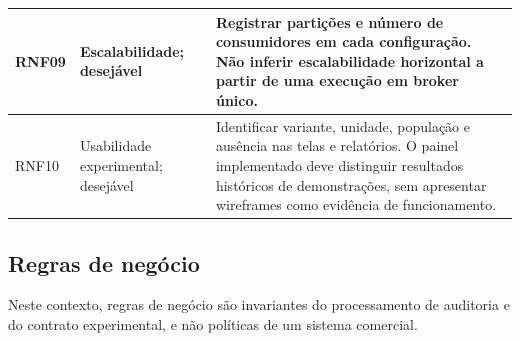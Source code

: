 {\begin{longtable}{>{\raggedright\arraybackslash}p{}>{\raggedright\arraybackslash}p{}>{\raggedright\arraybackslash}p{}}
RNF09 & Escalabilidade; desejável & Registrar partições e número de consumidores em cada configuração. Não inferir escalabilidade horizontal a partir de uma execução em broker único.\\ \hline
RNF10 & Usabilidade experimental; desejável & Identificar variante, unidade, população e ausência nas telas e relatórios. O painel implementado deve distinguir resultados históricos de demonstrações, sem apresentar wireframes como evidência de funcionamento.\\ \hline
\end{longtable}
\par
}

\subsection{Regras de negócio}
Neste contexto, regras de negócio são invariantes do processamento de auditoria e do contrato experimental, e não políticas de um sistema comercial.

